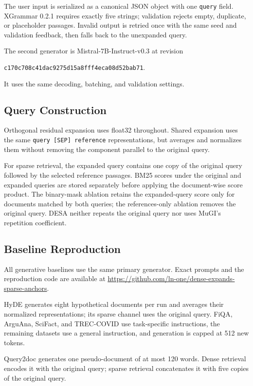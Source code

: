 The user input is serialized as a canonical JSON object with one
\texttt{query} field.
XGrammar 0.2.1 requires exactly five strings; validation rejects empty,
duplicate, or placeholder passages. Invalid output is retried once with the
same seed and validation feedback, then falls back to the unexpanded query.

The second generator is Mistral-7B-Instruct-v0.3 at revision

{\footnotesize\noindent\texttt{c170c708c41dac9275d15a8fff4eca08d52bab71}.\par}

It uses the same decoding, batching, and validation settings.

\subsection{Query Construction}

Orthogonal residual expansion uses float32 throughout. Shared expansion uses
the same \texttt{query [SEP] reference} representations, but averages and
normalizes them without removing the component parallel to the original query.

For sparse retrieval, the expanded query contains one copy of the original
query followed by the selected reference passages. BM25 scores under the
original and expanded queries are stored separately before applying the
document-wise score product. The binary-mask ablation retains the expanded-query
score only for documents matched by both queries; the references-only ablation
removes the original query. DESA neither repeats the original query nor uses
MuGI's repetition coefficient.

\subsection{Baseline Reproduction}

All generative baselines use the same primary generator. Exact prompts and the
reproduction code are available at
\url{https://github.com/ln-one/dense-expands-sparse-anchors}.

HyDE generates eight hypothetical documents per run and averages their
normalized representations; its sparse channel uses the original query. FiQA,
ArguAna, SciFact, and TREC-COVID use task-specific instructions, the remaining
datasets use a general instruction, and generation is capped at 512 new tokens.

Query2doc generates one pseudo-document of at most 120 words. Dense retrieval
encodes it with the original query; sparse retrieval concatenates it with five
copies of the original query.

